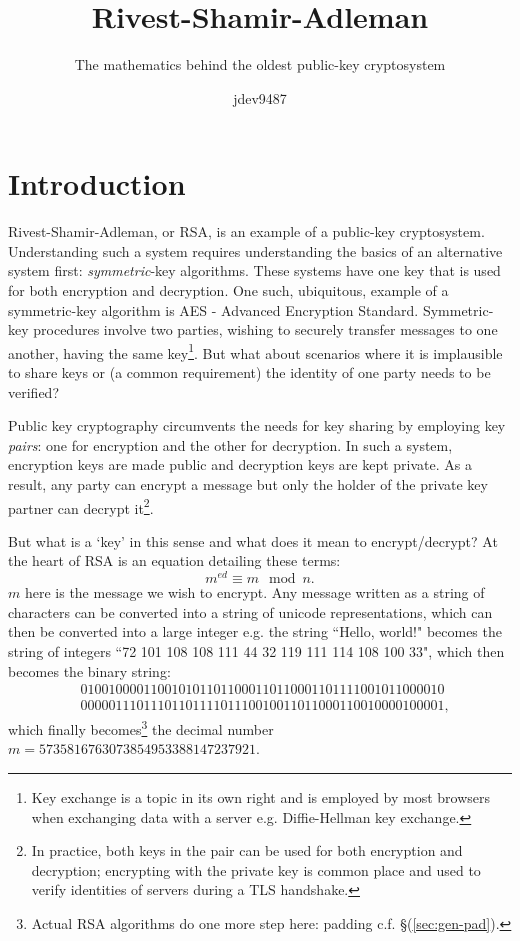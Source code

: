 \documentclass[]{scrartcl}
\author{jdev9487}
\title{Rivest-Shamir-Adleman}
\subtitle{The mathematics behind the oldest public-key cryptosystem}
\theoremstyle{definition}
\renewcommand{\sec}[1]{\S \ref{#1}}
\let\oldref\ref
\renewcommand{\ref}[1]{(\oldref{#1})}
\begin{document}
\maketitle

\tableofcontents
\pagebreak

\section{Introduction}
Rivest-Shamir-Adleman, or RSA, is an example of a public-key cryptosystem. Understanding such a system requires understanding the basics of an alternative system first: \textit{symmetric}-key algorithms. These systems have one key that is used for both encryption and decryption. One such, ubiquitous, example of a symmetric-key algorithm is AES - Advanced Encryption Standard. Symmetric-key procedures involve two parties, wishing to securely transfer messages to one another, having the same key\footnote{Key exchange is a topic in its own right and is employed by most browsers when exchanging data with a server e.g. Diffie-Hellman key exchange.}. But what about scenarios where it is implausible to share keys or (a common requirement) the identity of one party needs to be verified?

Public key cryptography circumvents the needs for key sharing by employing key \textit{pairs}: one for encryption and the other for decryption. In such a system, encryption keys are made public and decryption keys are kept private. As a result, any party can encrypt a message but only the holder of the private key partner can decrypt it\footnote{In practice, both keys in the pair can be used for both encryption and decryption; encrypting with the private key is common place and used to verify identities of servers during a TLS handshake.}.

But what is a `key' in this sense and what does it mean to encrypt/decrypt? At the heart of RSA is an equation detailing these terms:
\begin{equation}\label{eqn:declaration}
    m^{ed} \equiv m \mod n.
\end{equation}
$m$ here is the message we wish to encrypt. Any message written as a string of characters can be converted into a string of unicode representations, which can then be converted into a large integer e.g. the string ``Hello, world!" becomes the string of integers ``72 101 108 108 111 44 32 119 111 114 108 100 33", which then becomes the binary string:
\begin{align*}
    &0100100001100101011011000110110001101111001011000010 \\
    &0000011101110110111101110010011011000110010000100001,
\end{align*}
which finally becomes\footnote{Actual RSA algorithms do one more step here: padding c.f. \sec{sec:gen-pad}.} the decimal number $m=5735816763073854953388147237921$.
\end{document}

